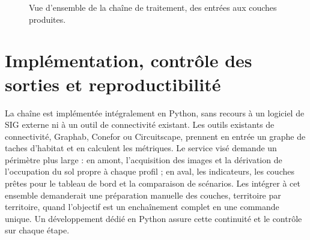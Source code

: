 \documentclass[a4paper,12pt]{report}
\begin{document}
\begin{figure}[H]
\caption{Vue d'ensemble de la chaîne de traitement, des entrées aux couches produites.}
\label{fig:pipeline}
\end{figure}

\section{Implémentation, contrôle des sorties et reproductibilité}
La chaîne est implémentée intégralement en Python, sans recours à un logiciel de SIG externe ni à un outil de connectivité existant. Les outils existants de connectivité, Graphab, Conefor ou Circuitscape, prennent en entrée un graphe de taches d'habitat et en calculent les métriques. Le service visé demande un périmètre plus large : en amont, l'acquisition des images et la dérivation de l'occupation du sol propre à chaque profil ; en aval, les indicateurs, les couches prêtes pour le tableau de bord et la comparaison de scénarios. Les intégrer à cet ensemble demanderait une préparation manuelle des couches, territoire par territoire, quand l'objectif est un enchaînement complet en une commande unique. Un développement dédié en Python assure cette continuité et le contrôle sur chaque étape.
\end{document}
